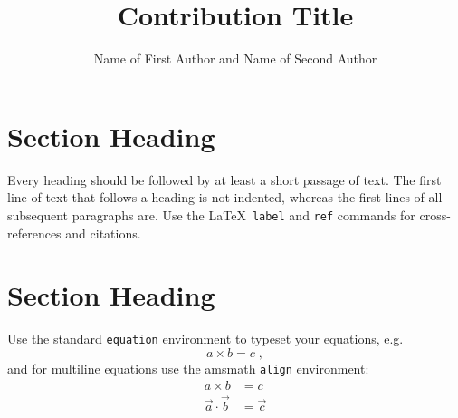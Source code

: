 \documentclass[graybox]{svmult}
\begin{document}
\title*{Contribution Title}
\author{Name of First Author and Name of Second Author}
%
%
\maketitle


\section{Section Heading}
\label{sec:1}
Every heading should be followed by at least a short passage of text. The first line of text that follows a heading is not indented, whereas the first lines of all subsequent paragraphs are. Use the \LaTeX\ \verb!label! and \verb!ref! commands for cross-references and citations. 

\section{Section Heading}
\label{sec:2}

Use the standard \verb|equation| environment to typeset your equations, e.g.
%
\begin{equation}
a \times b = c\;,
\end{equation}
%
and for multiline equations use the amsmath \verb|align| environment:
\begin{align}
a \times b & = c \nonumber\\
\vec{a} \cdot \vec{b} & =\vec{c}
\label{eq:01}
\end{align}
\end{document}
